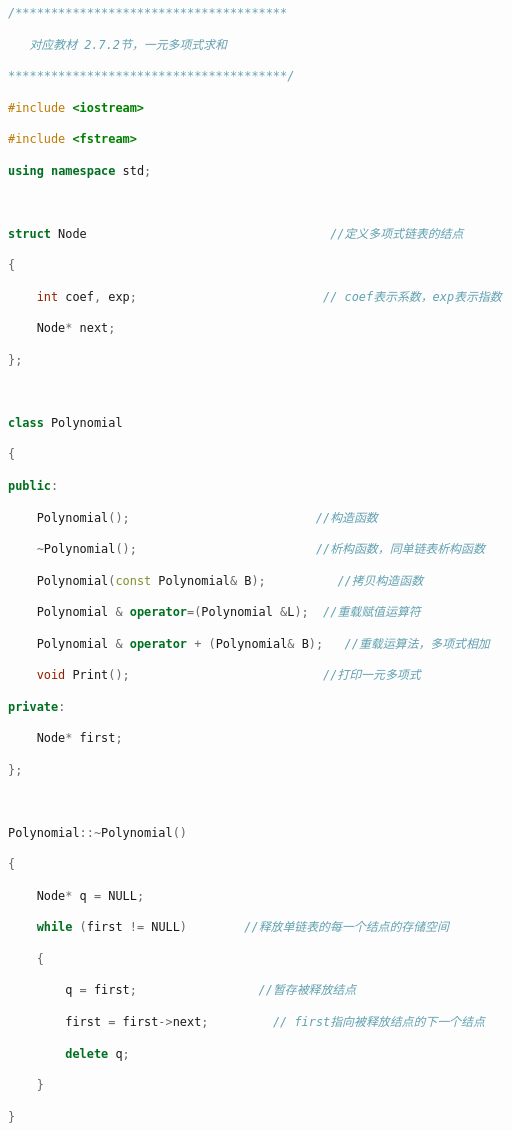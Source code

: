 \begin{lstlisting}[language=C++]
/**************************************

   对应教材 2.7.2节，一元多项式求和

***************************************/

#include <iostream>      

#include <fstream>

using namespace std;

  

struct Node                                  //定义多项式链表的结点

{

    int coef, exp;                          // coef表示系数，exp表示指数

    Node* next;

};

  

class Polynomial

{

public:

    Polynomial();                          //构造函数

    ~Polynomial();                         //析构函数，同单链表析构函数

    Polynomial(const Polynomial& B);          //拷贝构造函数

    Polynomial & operator=(Polynomial &L);  //重载赋值运算符

    Polynomial & operator + (Polynomial& B);   //重载运算法，多项式相加

    void Print();                           //打印一元多项式

private:

    Node* first;

};

  

Polynomial::~Polynomial()

{

    Node* q = NULL;

    while (first != NULL)        //释放单链表的每一个结点的存储空间

    {

        q = first;                 //暂存被释放结点

        first = first->next;         // first指向被释放结点的下一个结点

        delete q;

    }

}


\end{lstlisting}

